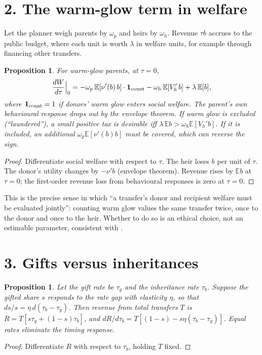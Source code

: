 \documentclass[11pt]{article}
\newtheorem{proposition}[theorem]{Proposition}
\theoremstyle{definition}
\begin{document}
\section*{2. The warm-glow term in welfare}
Let the planner weigh parents by $\omega_p$ and heirs by $\omega_h$. Revenue $\tau b$ accrues to the public budget, where each
unit is worth $\lambda$ in welfare units, for example through financing other transfers.
\begin{proposition}\label{prop:wg}
For warm-glow parents, at $\tau=0$,
\[
 \frac{dW}{d\tau}\Big|_{0}=-\omega_p\,\mathbb E[\nu'(b)\,b]\cdot\mathbf 1_{\rm count}-\omega_h\,\mathbb E[V_h'\,b]+\lambda\,\mathbb E[b],
\]
where $\mathbf 1_{\rm count}=1$ if donors' warm glow enters social welfare. The parent's own behavioural response drops out
by the envelope theorem. If warm glow is excluded (``laundered''), a small positive tax is desirable iff
$\lambda\,\mathbb E b>\omega_h\mathbb E[V_h'b]$. If it is included, an additional
$\omega_p\mathbb E[\nu'(b)b]$ must be covered, which can reverse the sign.
\end{proposition}
\begin{proof}
Differentiate social welfare with respect to $\tau$. The heir loses $b$ per unit of $\tau$. The donor's utility changes by
$-\nu'b$ (envelope theorem). Revenue rises by $\mathbb E b$ at $\tau=0$; the first-order revenue loss from behavioural
responses is zero at $\tau=0$.
\end{proof}
This is the precise sense in which ``a transfer's donor and recipient welfare must be evaluated jointly'': counting warm
glow values the same transfer twice, once to the donor and once to the heir. Whether to do so is an ethical choice, not an
estimable parameter, consistent with \cite{ps}.

\section*{3. Gifts versus inheritances}
\begin{proposition}\label{prop:timing}
Let the gift rate be $\tau_g$ and the inheritance rate $\tau_b$. Suppose the gifted share $s$ responds to the rate gap with
elasticity $\eta$, so that $ds/s=\eta\,d(\tau_b-\tau_g)$. Then revenue from total transfers $T$ is
$R=T[s\tau_g+(1-s)\tau_b]$, and $dR/d\tau_b=T[(1-s)-s\eta(\tau_b-\tau_g)]$. Equal rates eliminate the timing response.
\end{proposition}
\begin{proof}
Differentiate $R$ with respect to $\tau_b$, holding $T$ fixed.
\end{proof}
\end{document}
